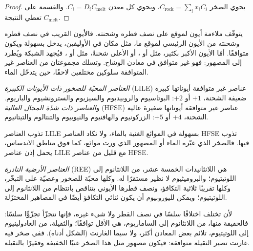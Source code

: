 \begin{proof}
يحوي الصخر $C_{\mathrm{rock}} = \sum_i x_i C_i$، ويحوي كل معدن
$C_i = D_i C_{\mathrm{melt}}$. والقسمة على $C_{\mathrm{melt}}$ تعطي النتيجة.
\end{proof}

يتوقّف ملاءمة أيون لموقع على نصف قطره وشحنته. فالأيون القريب في
نصف قطره وشحنته من الأيون الرئيسي لموقع ما، مثل  مكان  في
الأوليفين، يدخل بسهولة ويكون متوافقًا. أمّا الأيون الأكبر بكثير، مثل
 أو ، أو الأعلى شحنةً، مثل  أو
، فيُجهد الشبكة ويُطرد إلى المصهور: فهو
غير متوافق في معادن الوشاح. وتسلك مجموعتان من العناصر غير المتوافقة
سلوكين مختلفين لاحقًا، حين يتدخّل الماء.

\begin{definition}
\label{def:b2:elements-in-the-earth:lile-hfse}
\emph{العناصر المحبّة للصخور ذات الأيونات الكبيرة}
(LILE) عناصر غير متوافقة أيوناتها كبيرة ضعيفة الشحنة، $+1$ أو $+2$:
البوتاسيوم والروبيديوم والسيزيوم والسترونشيوم والباريوم.
و\emph{العناصر ذات شدّة المجال العالية} (HFSE)
عناصر غير متوافقة أيوناتها صغيرة عالية الشحنة، $+4$ أو $+5$:
الزركونيوم والهافنيوم والنيوبيوم والتنتالوم والتيتانيوم.
\end{definition}

تذوب العناصر LILE بسهولة في الموائع الغنية بالماء، ولا تكاد العناصر HFSE تذوب فيها. فالصخر
الذي غيّره الماء أو المصهور الذي ورث موائع، كما فوق مناطق الاندساس،
يحمل إذن عناصر LILE مع قليل من عناصر HFSE.

\begin{definition}\label{def:b2:elements-in-the-earth:ree}
\emph{العناصر الأرضية النادرة} (REE) هي اللانثانيدات
الخمسة عشر، من اللانثانوم إلى اللوتيتيوم؛ والبروميثيوم لا نظير مستقرًا له. وكلها
محبّة للصخور وعصيّة على التبخّر، وكلها تقريبًا ثلاثية التكافؤ، ونصف قطرها الأيوني
يتناقص بانتظام من اللانثانوم إلى اللوتيتيوم؛ ويمكن لليوروبيوم أن يكون ثنائي التكافؤ أيضًا في
المصاهير المختزَلة.
\end{definition}

لأن  تختلف اختلافًا سلسًا في نصف القطر ولا شيء غيره،
فإنها تتجزّأ تجزّؤًا سلسًا: فالخفيفة منها، من اللانثانوم إلى الساماريوم، هي الأقل
توافقًا؛ والثقيلة، من الغادولينيوم إلى اللوتيتيوم، تلائم بعض
المعادن أكثر، ولا سيما الغارنت (الشكل أدناه). ففي صخر فيه غارنت تصير 
الثقيلة متوافقة: فيكون مصهور مثل هذا الصخر غنيًا  الخفيفة
وفقيرًا بالثقيلة.

